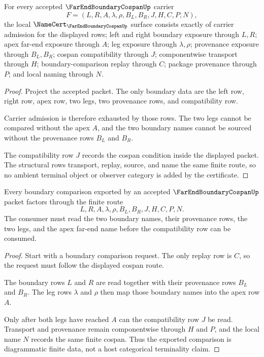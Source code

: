\begin{theorem}
\label{thm:far-end-boundary-cospan-namecert-obligations}
For every accepted $\FarEndBoundaryCospanUp$ carrier
$$
F=(L,R,A,\lambda,\rho,B_L,B_R,J,H,C,P,N),
$$
the local $\NameCert_{\FarEndBoundaryCospanUp}$ surface consists exactly of carrier admission for the displayed rows; left and right boundary exposure through $L,R$; apex far-end exposure through $A$; leg exposure through $\lambda,\rho$; provenance exposure through $B_L,B_R$; cospan compatibility through $J$; componentwise transport through $H$; boundary-comparison replay through $C$; package provenance through $P$; and local naming through $N$.
\end{theorem}
\begin{proof}
Project the accepted packet. The only boundary data are the left row, right row, apex row, two legs, two provenance rows, and compatibility row.

Carrier admission is therefore exhausted by those rows. The two legs cannot be compared without the apex $A$, and the two boundary names cannot be sourced without the provenance rows $B_L$ and $B_R$.

The compatibility row $J$ records the cospan condition inside the displayed packet. The structural rows transport, replay, source, and name the same finite route, so no ambient terminal object or observer category is added by the certificate.
\end{proof}

\begin{theorem}
\label{thm:far-end-boundary-cospan-diagrammatic-route}
Every boundary comparison exported by an accepted $\FarEndBoundaryCospanUp$ packet factors through the finite route
$$
L,R,A,\lambda,\rho,B_L,B_R,J,H,C,P,N.
$$
The consumer must read the two boundary names, their provenance rows, the two legs, and the apex far-end name before the compatibility row can be consumed.
\end{theorem}
\begin{proof}
Start with a boundary comparison request. The only replay row is $C$, so the request must follow the displayed cospan route.

The boundary rows $L$ and $R$ are read together with their provenance rows $B_L$ and $B_R$. The leg rows $\lambda$ and $\rho$ then map those boundary names into the apex row $A$.

Only after both legs have reached $A$ can the compatibility row $J$ be read. Transport and provenance remain componentwise through $H$ and $P$, and the local name $N$ records the same finite cospan. Thus the exported comparison is diagrammatic finite data, not a host categorical terminality claim.
\end{proof}

